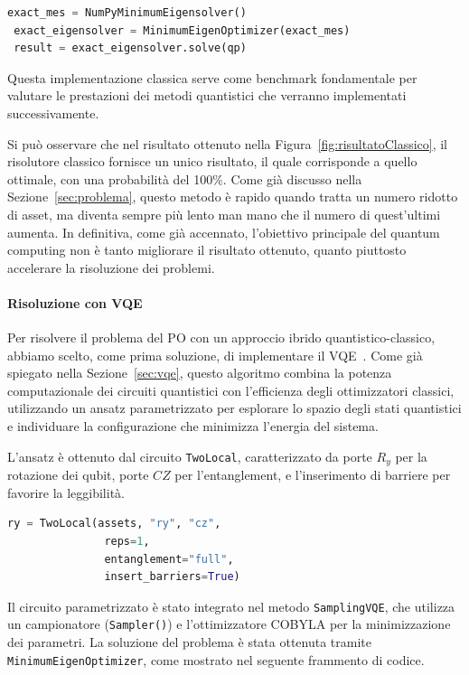 \begin{lstlisting}[language=python, caption={Risoluzione classica del problema utilizzando \texttt{NumPyMinimumEigensolver.}}]
 exact_mes = NumPyMinimumEigensolver()
 exact_eigensolver = MinimumEigenOptimizer(exact_mes)
 result = exact_eigensolver.solve(qp)
\end{lstlisting}

Questa implementazione classica serve come benchmark fondamentale per 
valutare le prestazioni dei metodi quantistici che verranno 
implementati successivamente.

Si può osservare che nel risultato ottenuto nella Figura~\ref{fig:risultatoClassico}, il risolutore 
classico fornisce un unico risultato, il quale corrisponde a quello ottimale, con una probabilità 
del 100\%. Come già discusso nella Sezione~\ref{sec:problema}, questo metodo 
è rapido quando tratta un numero ridotto di asset, ma diventa sempre più lento 
man mano che il numero di quest'ultimi aumenta. In definitiva, come già accennato, 
l'obiettivo principale del quantum computing non è tanto migliorare il 
risultato ottenuto, quanto piuttosto accelerare la risoluzione dei problemi.

\paragraph{Risoluzione con VQE}
Per risolvere il problema del PO con un approccio ibrido quantistico-classico, 
abbiamo scelto, come prima soluzione, di implementare il VQE~\cite{qiskit_portfolio_optimization}. Come già spiegato 
nella Sezione~\ref{sec:vqe}, questo algoritmo combina la potenza computazionale 
dei circuiti quantistici con l'efficienza degli ottimizzatori classici, utilizzando 
un ansatz parametrizzato per esplorare lo spazio degli stati quantistici e 
individuare la configurazione che minimizza l'energia del sistema.

L'ansatz è ottenuto dal circuito \texttt{TwoLocal}, caratterizzato da porte $R_y$ per 
la rotazione dei qubit, porte $CZ$ per l'entanglement, e l'inserimento di barriere 
per favorire la leggibilità.

\begin{lstlisting}[language=python]
 ry = TwoLocal(assets, "ry", "cz", 
               reps=1, 
               entanglement="full", 
               insert_barriers=True)
\end{lstlisting}

Il circuito parametrizzato è stato integrato nel metodo \texttt{SamplingVQE}, che 
utilizza un campionatore (\texttt{Sampler()}) e l'ottimizzatore COBYLA per la 
minimizzazione dei parametri. La soluzione del problema è stata ottenuta tramite 
\texttt{MinimumEigenOptimizer}, come mostrato nel seguente frammento di codice.

